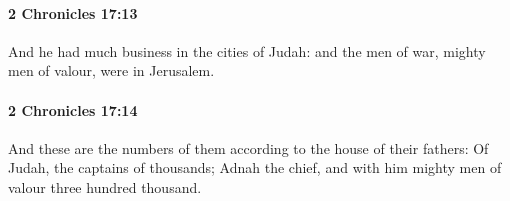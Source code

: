 		\paragraph{2 Chronicles 17:13} %
			\label{2CHRONICLES-17-13}

			And he had much business in the cities of Judah: and the men of war, mighty men of valour, were in Jerusalem.


		\paragraph{2 Chronicles 17:14} %
			\label{2CHRONICLES-17-14}

			And these are the numbers of them according to the house of their fathers: Of Judah, the captains of thousands; Adnah the chief, and with him mighty men of valour three hundred thousand.


